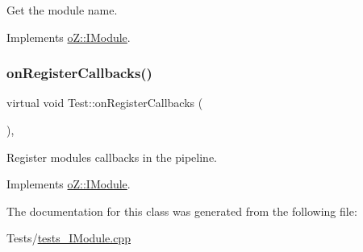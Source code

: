 Get the module name. 



Implements \mbox{\hyperlink{classo_z_1_1_i_module_af41d45158fd28e1bd86a34e25f5282d6}{o\+Z\+::\+I\+Module}}.

\mbox{\label{class_test_a7f2db863bfcc353124a75aa2b72af1bf}} 
\subsubsection{\texorpdfstring{onRegisterCallbacks()}{onRegisterCallbacks()}}
{\footnotesize\ttfamily virtual void Test\+::on\+Register\+Callbacks (\begin{DoxyParamCaption}\item[{\mbox{\hyperlink{classo_z_1_1_pipeline}{o\+Z\+::\+Pipeline}} \&}]{ }\end{DoxyParamCaption})\hspace{0.3cm}{\ttfamily [inline]}, {\ttfamily [virtual]}}



Register module\textquotesingle{}s callbacks in the pipeline. 



Implements \mbox{\hyperlink{classo_z_1_1_i_module_a3dc905faa6df5e22eecc6ffbc923fd95}{o\+Z\+::\+I\+Module}}.



The documentation for this class was generated from the following file\+:\begin{DoxyCompactItemize}
\item 
Tests/\mbox{\hyperlink{tests___i_module_8cpp}{tests\+\_\+\+I\+Module.\+cpp}}\end{DoxyCompactItemize}
